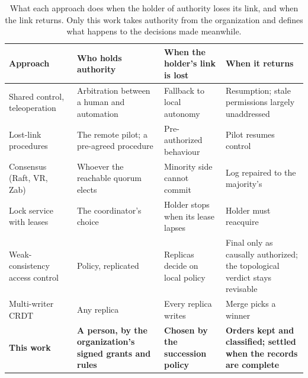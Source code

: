 \begin{table}[t]
\caption{What each approach does when the holder of authority loses its link, and when the
link returns. Only this work takes authority from the organization and defines what happens
to the decisions made meanwhile.}
\label{tab:positioning}
\footnotesize
\setlength{\tabcolsep}{3pt}
\begin{tabularx}{\textwidth}{@{}>{\raggedright\arraybackslash}p{}>{\raggedright\arraybackslash}p{}>{\raggedright\arraybackslash}p{}>{\raggedright\arraybackslash}X@{}}
\toprule
\textbf{Approach} & \textbf{Who holds authority} & \textbf{When the holder's link is lost} & \textbf{When it returns} \\
\midrule
Shared control, teleoperation~\cite{abbink2018topology,darvish2023teleoperation} & Arbitration between a human and automation & Fallback to local autonomy & Resumption; stale permissions largely unaddressed \\
\addlinespace
Lost-link procedures~\cite{reyesmunoz2023rpas,sakakeeny2024lost} & The remote pilot; a pre-agreed procedure & Pre-authorized behaviour & Pilot resumes control \\
\addlinespace
Consensus (Raft, VR, Zab)~\cite{ongaro2014raft,oki1988viewstamped,junqueira2011zab} & Whoever the reachable quorum elects & Minority side cannot commit & Log repaired to the majority's \\
\addlinespace
Lock service with leases~\cite{burrows2006chubby,hunt2010zookeeper} & The coordinator's choice & Holder stops when its lease lapses & Holder must reacquire \\
\addlinespace
Weak-consistency access control~\cite{wobber2010policy,jacob2025eventually} & Policy, replicated & Replicas decide on local policy & Final only as causally authorized; the topological verdict stays revisable \\
\addlinespace
Multi-writer CRDT~\cite{hanssen2025emergency} & Any replica & Every replica writes & Merge picks a winner \\
\addlinespace
\textbf{This work} & \textbf{A person, by the organization's signed grants and rules} & \textbf{Chosen by the succession policy} & \textbf{Orders kept and classified; settled when the records are complete} \\
\bottomrule
\end{tabularx}
\end{table}
